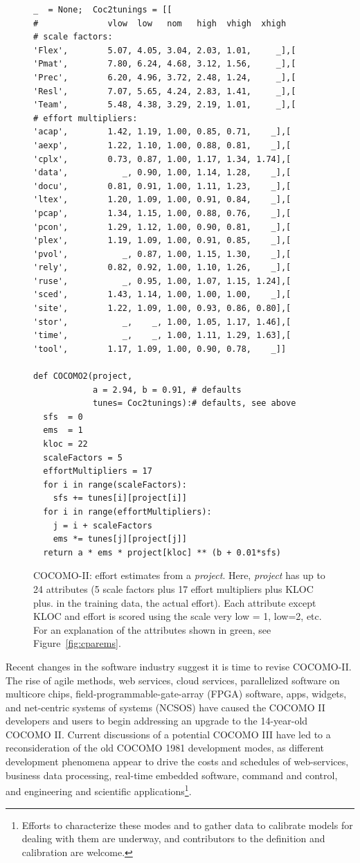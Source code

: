 \documentclass{sig-alternate}
\newcommand{\fig}[1]{Figure~\ref{fig:#1}}
\begin{document}
\begin{figure}[!t]
\begin{lstlisting}
_  = None;  Coc2tunings = [[
#              vlow  low   nom   high  vhigh  xhigh   
# scale factors:
'Flex',        5.07, 4.05, 3.04, 2.03, 1.01,     _],[
'Pmat',        7.80, 6.24, 4.68, 3.12, 1.56,     _],[
'Prec',        6.20, 4.96, 3.72, 2.48, 1.24,     _],[
'Resl',        7.07, 5.65, 4.24, 2.83, 1.41,     _],[
'Team',        5.48, 4.38, 3.29, 2.19, 1.01,     _],[
# effort multipliers:        
'acap',        1.42, 1.19, 1.00, 0.85, 0.71,    _],[
'aexp',        1.22, 1.10, 1.00, 0.88, 0.81,    _],[
'cplx',        0.73, 0.87, 1.00, 1.17, 1.34, 1.74],[
'data',           _, 0.90, 1.00, 1.14, 1.28,    _],[
'docu',        0.81, 0.91, 1.00, 1.11, 1.23,    _],[
'ltex',        1.20, 1.09, 1.00, 0.91, 0.84,    _],[
'pcap',        1.34, 1.15, 1.00, 0.88, 0.76,    _],[ 
'pcon',        1.29, 1.12, 1.00, 0.90, 0.81,    _],[
'plex',        1.19, 1.09, 1.00, 0.91, 0.85,    _],[ 
'pvol',           _, 0.87, 1.00, 1.15, 1.30,    _],[
'rely',        0.82, 0.92, 1.00, 1.10, 1.26,    _],[
'ruse',           _, 0.95, 1.00, 1.07, 1.15, 1.24],[
'sced',        1.43, 1.14, 1.00, 1.00, 1.00,    _],[ 
'site',        1.22, 1.09, 1.00, 0.93, 0.86, 0.80],[ 
'stor',           _,    _, 1.00, 1.05, 1.17, 1.46],[
'time',           _,    _, 1.00, 1.11, 1.29, 1.63],[
'tool',        1.17, 1.09, 1.00, 0.90, 0.78,    _]]

def COCOMO2(project, 
            a = 2.94, b = 0.91, # defaults
            tunes= Coc2tunings):# defaults, see above
  sfs  = 0
  ems  = 1 
  kloc = 22
  scaleFactors = 5 
  effortMultipliers = 17
  for i in range(scaleFactors):
    sfs += tunes[i][project[i]]
  for i in range(effortMultipliers):
    j = i + scaleFactors
    ems *= tunes[j][project[j]] 
  return a * ems * project[kloc] ** (b + 0.01*sfs) 
\end{lstlisting}
\caption{COCOMO-II: effort estimates from a {\em project}.
Here, {\em project} has up to 24 attributes  (5 scale
factors plus 17 effort multipliers plus KLOC plus. in the training data, the actual effort).
Each attribute except KLOC and effort is scored
using the scale very low = 1, low=2, etc.
For an explanation of the attributes shown in
green, see \fig{cparems}.}\label{fig:coc2}
\end{figure}

Recent changes in the software industry
suggest  it is time  to revise COCOMO-II.
The rise of agile methods, web
services, cloud services, parallelized software on
multicore chips, field-programmable-gate-array
(FPGA) software, apps, widgets, and net-centric
systems of systems (NCSOS) have caused the COCOMO II
developers and users to begin addressing an upgrade
to the 14-year-old COCOMO II. 
Current discussions
of a potential COCOMO III have led to a
reconsideration of the old COCOMO 1981 development
modes, as different development phenomena appear to
drive the costs and schedules of web-services,
business data processing, real-time embedded
software, command and control, and engineering and
scientific applications\footnote{
Efforts to characterize
these modes and to gather data to calibrate models
for dealing with them are underway, and contributors
to the definition and calibration are welcome.}.  
\end{document}
